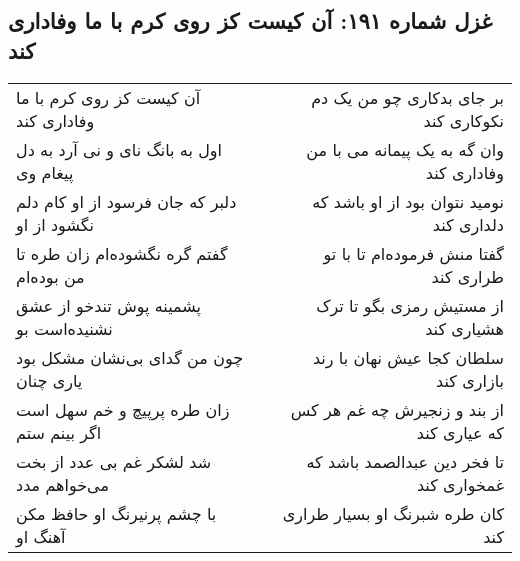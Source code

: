 \begin{center}
\section*{غزل شماره ۱۹۱: آن کیست کز روی کرم با ما وفاداری کند}
\label{sec:sh191}
\begin{longtable}{l p{0.5cm} r}
آن کیست کز روی کرم با ما وفاداری کند
&&
بر جای بدکاری چو من یک دم نکوکاری کند
\\
اول به بانگ نای و نی آرد به دل پیغام وی
&&
وان گه به یک پیمانه می با من وفاداری کند
\\
دلبر که جان فرسود از او کام دلم نگشود از او
&&
نومید نتوان بود از او باشد که دلداری کند
\\
گفتم گره نگشوده‌ام زان طره تا من بوده‌ام
&&
گفتا منش فرموده‌ام تا با تو طراری کند
\\
پشمینه پوش تندخو از عشق نشنیده‌است بو
&&
از مستیش رمزی بگو تا ترک هشیاری کند
\\
چون من گدای بی‌نشان مشکل بود یاری چنان
&&
سلطان کجا عیش نهان با رند بازاری کند
\\
زان طره پرپیچ و خم سهل است اگر بینم ستم
&&
از بند و زنجیرش چه غم هر کس که عیاری کند
\\
شد لشکر غم بی عدد از بخت می‌خواهم مدد
&&
تا فخر دین عبدالصمد باشد که غمخواری کند
\\
با چشم پرنیرنگ او حافظ مکن آهنگ او
&&
کان طره شبرنگ او بسیار طراری کند
\\
\end{longtable}
\end{center}
